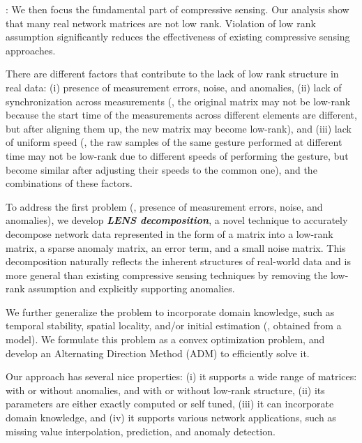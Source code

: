 : We then focus the fundamental part of compressive sensing. Our analysis show that many real network matrices are not low rank. Violation of low rank assumption significantly reduces the effectiveness of existing compressive sensing approaches. 

There are different factors that contribute to the lack of low rank structure in real data: (i) presence of measurement errors, noise, and anomalies, (ii) lack of synchronization across measurements (\eg, the original matrix may not be low-rank because the start time of the measurements across different elements are different, but after aligning them up, the new matrix may become low-rank), and (iii) lack of uniform speed (\eg, the raw samples of the same gesture performed at different time may not be low-rank due to different speeds of performing the gesture, but become similar after adjusting their speeds to the common one), and the combinations of these factors.

To address the first problem (\ie, presence of measurement errors, noise, and anomalies), we develop \textbf{\textit{LENS decomposition}}, a novel technique to accurately decompose network data represented in the form of a matrix into a low-rank matrix, a sparse anomaly matrix, an error term, and a small noise matrix. This decomposition naturally reflects the inherent structures of real-world data and is more general than existing compressive sensing techniques by removing the low-rank assumption and explicitly supporting anomalies. 

We further generalize the problem to incorporate domain knowledge, such as temporal stability, spatial locality, and/or initial estimation (\eg, obtained from a model).
We formulate this problem as a convex optimization problem, and develop an Alternating Direction Method (ADM) to efficiently solve it.

Our approach has several nice properties: (i) it supports a wide range of matrices: with or without anomalies, and with or without low-rank structure, (ii) its parameters are either exactly computed or self tuned, (iii) it can incorporate domain knowledge, and (iv) it supports various network applications, such as missing value interpolation, prediction, and anomaly detection. 

